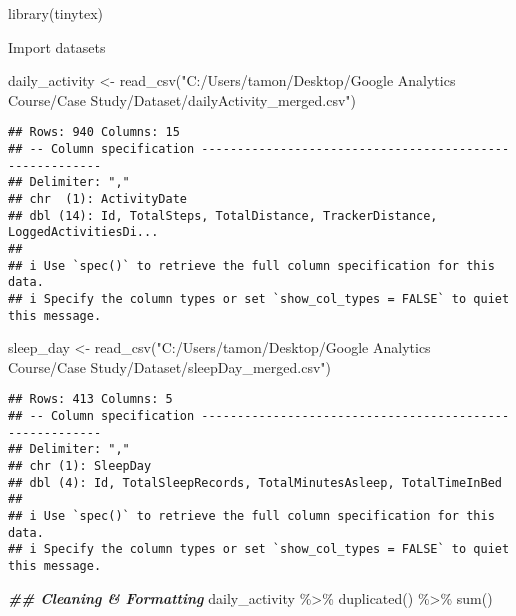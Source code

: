 \documentclass[
]{article}
\newenvironment{Shaded}{\begin{snugshade}}{\end{snugshade}}
\newcommand{\DocumentationTok}[1]{\textcolor[rgb]{0.56,0.35,0.01}{\textbf{\textit{#1}}}}
\newcommand{\FunctionTok}[1]{\textcolor[rgb]{0.00,0.00,0.00}{#1}}
\newcommand{\NormalTok}[1]{#1}
\newcommand{\OtherTok}[1]{\textcolor[rgb]{0.56,0.35,0.01}{#1}}
\newcommand{\SpecialCharTok}[1]{\textcolor[rgb]{0.00,0.00,0.00}{#1}}
\newcommand{\StringTok}[1]{\textcolor[rgb]{0.31,0.60,0.02}{#1}}
\begin{document}
\begin{Shaded}
\begin{Highlighting}[]
\FunctionTok{library}\NormalTok{(tinytex)}
\end{Highlighting}
\end{Shaded}

Import datasets

\begin{Shaded}
\begin{Highlighting}[]
\NormalTok{daily\_activity }\OtherTok{\textless{}{-}} \FunctionTok{read\_csv}\NormalTok{(}\StringTok{"C:/Users/tamon/Desktop/Google Analytics Course/Case Study/Dataset/dailyActivity\_merged.csv"}\NormalTok{)}
\end{Highlighting}
\end{Shaded}

\begin{verbatim}
## Rows: 940 Columns: 15
## -- Column specification --------------------------------------------------------
## Delimiter: ","
## chr  (1): ActivityDate
## dbl (14): Id, TotalSteps, TotalDistance, TrackerDistance, LoggedActivitiesDi...
## 
## i Use `spec()` to retrieve the full column specification for this data.
## i Specify the column types or set `show_col_types = FALSE` to quiet this message.
\end{verbatim}

\begin{Shaded}
\begin{Highlighting}[]
\NormalTok{sleep\_day }\OtherTok{\textless{}{-}} \FunctionTok{read\_csv}\NormalTok{(}\StringTok{"C:/Users/tamon/Desktop/Google Analytics Course/Case Study/Dataset/sleepDay\_merged.csv"}\NormalTok{)}
\end{Highlighting}
\end{Shaded}

\begin{verbatim}
## Rows: 413 Columns: 5
## -- Column specification --------------------------------------------------------
## Delimiter: ","
## chr (1): SleepDay
## dbl (4): Id, TotalSleepRecords, TotalMinutesAsleep, TotalTimeInBed
## 
## i Use `spec()` to retrieve the full column specification for this data.
## i Specify the column types or set `show_col_types = FALSE` to quiet this message.
\end{verbatim}

\begin{Shaded}
\begin{Highlighting}[]
\DocumentationTok{\#\# Cleaning \& Formatting}
\NormalTok{daily\_activity }\SpecialCharTok{\%\textgreater{}\%}
  \FunctionTok{duplicated}\NormalTok{() }\SpecialCharTok{\%\textgreater{}\%}
  \FunctionTok{sum}\NormalTok{()}
\end{Highlighting}
\end{Shaded}
\end{document}
